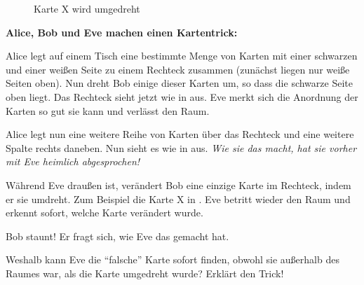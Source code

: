\documentclass[9pt, a4paper]{arbeitsblatt}
\begin{document}
\begin{wrapfix}
\begin{wrapfigure}{r}{4.5cm}
\capstart
{}
\caption{Karte X wird umgedreht}\label{abb:abb3}
\end{wrapfigure}
\textbf{Alice, Bob und Eve machen einen Kartentrick:}

Alice legt auf einem Tisch eine bestimmte Menge von Karten mit einer schwarzen
und einer weißen Seite zu einem Rechteck zusammen (zunächst liegen nur weiße
Seiten oben). Nun dreht Bob einige dieser Karten um, so dass die schwarze Seite
oben liegt. Das Rechteck sieht jetzt wie in  aus. Eve merkt sich die
Anordnung der Karten so gut sie kann und verlässt den Raum.

Alice legt nun eine weitere Reihe von Karten über das Rechteck und eine weitere
Spalte rechts daneben. Nun sieht es wie in  aus. \textit{Wie sie das
macht, hat sie vorher mit Eve heimlich abgesprochen!}

Während Eve draußen ist, verändert Bob eine einzige Karte im Rechteck, indem er
sie umdreht. Zum Beispiel die Karte X in . Eve betritt wieder den Raum
und erkennt sofort, welche Karte verändert wurde.

Bob staunt! Er fragt sich, wie Eve das gemacht hat.

\begin{aufgabe}[icon=\iconPartner]
	Weshalb kann Eve die \enquote{falsche} Karte sofort finden, obwohl sie außerhalb
	des Raumes war, als die Karte umgedreht wurde? Erklärt den Trick!


\end{aufgabe}
\end{wrapfix}
\end{document}
